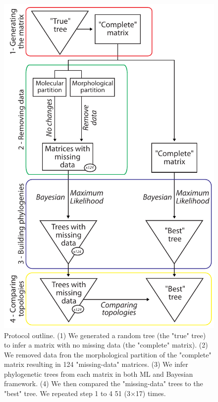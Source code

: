\documentclass[12pt,letterpaper]{article}
\begin{document}
\begin{figure}
\centering
\includegraphics[keepaspectratio=true]{Figures/TEM_Fig_outline.pdf}
\caption{Protocol outline.
(1) We generated a random tree (the "true" tree) to infer a matrix with no missing data (the "complete" matrix).
(2) We removed data fron the morphological partition of the "complete" matrix resulting in 124 "missing-data" matrices.
(3) We infer phylogenetic trees from each matrix in both ML and Bayesian framework.
(4) We then compared the "missing-data" trees to the "best" tree.
We repeated step 1 to 4 51 (3$\times $17) times.}
\label{Fig_Outline}
\end{figure}
\end{document}

